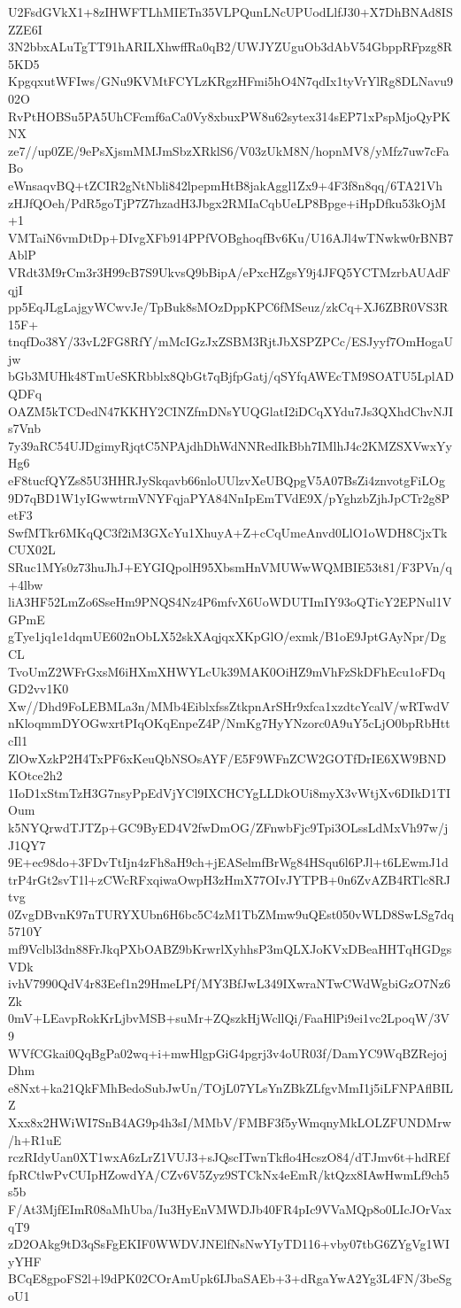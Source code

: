 U2FsdGVkX1+8zIHWFTLhMIETn35VLPQunLNcUPUodLlfJ30+X7DhBNAd8ISZZE6I
3N2bbxALuTgTT91hARILXhwffRa0qB2/UWJYZUguOb3dAbV54GbppRFpzg8R5KD5
KpgqxutWFIws/GNu9KVMtFCYLzKRgzHFmi5hO4N7qdIx1tyVrYlRg8DLNavu902O
RvPtHOBSu5PA5UhCFcmf6aCa0Vy8xbuxPW8u62sytex314sEP71xPspMjoQyPKNX
ze7//up0ZE/9ePsXjsmMMJmSbzXRklS6/V03zUkM8N/hopnMV8/yMfz7uw7cFaBo
eWnsaqvBQ+tZCIR2gNtNbli842lpepmHtB8jakAggl1Zx9+4F3f8n8qq/6TA21Vh
zHJfQOeh/PdR5goTjP7Z7hzadH3Jbgx2RMIaCqbUeLP8Bpge+iHpDfku53kOjM+1
VMTaiN6vmDtDp+DIvgXFb914PPfVOBghoqfBv6Ku/U16AJl4wTNwkw0rBNB7AblP
VRdt3M9rCm3r3H99cB7S9UkvsQ9bBipA/ePxcHZgsY9j4JFQ5YCTMzrbAUAdFqjI
pp5EqJLgLajgyWCwvJe/TpBuk8sMOzDppKPC6fMSeuz/zkCq+XJ6ZBR0VS3R15F+
tnqfDo38Y/33vL2FG8RfY/mMcIGzJxZSBM3RjtJbXSPZPCc/ESJyyf7OmHogaUjw
bGb3MUHk48TmUeSKRbblx8QbGt7qBjfpGatj/qSYfqAWEcTM9SOATU5LplADQDFq
OAZM5kTCDedN47KKHY2CINZfmDNsYUQGlatI2iDCqXYdu7Js3QXhdChvNJIs7Vnb
7y39aRC54UJDgimyRjqtC5NPAjdhDhWdNNRedIkBbh7IMlhJ4c2KMZSXVwxYyHg6
eF8tucfQYZs85U3HHRJySkqavb66nloUUlzvXeUBQpgV5A07BsZi4znvotgFiLOg
9D7qBD1W1yIGwwtrmVNYFqjaPYA84NnIpEmTVdE9X/pYghzbZjhJpCTr2g8PetF3
SwfMTkr6MKqQC3f2iM3GXcYu1XhuyA+Z+cCqUmeAnvd0LlO1oWDH8CjxTkCUX02L
SRuc1MYs0z73huJhJ+EYGIQpolH95XbsmHnVMUWwWQMBIE53t81/F3PVn/q+4lbw
liA3HF52LmZo6SseHm9PNQS4Nz4P6mfvX6UoWDUTImIY93oQTicY2EPNul1VGPmE
gTye1jq1e1dqmUE602nObLX52skXAqjqxXKpGlO/exmk/B1oE9JptGAyNpr/DgCL
TvoUmZ2WFrGxsM6iHXmXHWYLcUk39MAK0OiHZ9mVhFzSkDFhEcu1oFDqGD2vv1K0
Xw//Dhd9FoLEBMLa3n/MMb4EiblxfssZtkpnArSHr9xfca1xzdtcYcalV/wRTwdV
nKloqmmDYOGwxrtPIqOKqEnpeZ4P/NmKg7HyYNzorc0A9uY5cLjO0bpRbHttcIl1
ZlOwXzkP2H4TxPF6xKeuQbNSOsAYF/E5F9WFnZCW2GOTfDrIE6XW9BNDKOtce2h2
1IoD1xStmTzH3G7nsyPpEdVjYCl9IXCHCYgLLDkOUi8myX3vWtjXv6DIkD1TIOum
k5NYQrwdTJTZp+GC9ByED4V2fwDmOG/ZFnwbFjc9Tpi3OLssLdMxVh97w/jJ1QY7
9E+ec98do+3FDvTtIjn4zFh8aH9ch+jEASelmfBrWg84HSqu6l6PJl+t6LEwmJ1d
trP4rGt2svT1l+zCWcRFxqiwaOwpH3zHmX77OIvJYTPB+0n6ZvAZB4RTlc8RJtvg
0ZvgDBvnK97nTURYXUbn6H6bc5C4zM1TbZMmw9uQEst050vWLD8SwLSg7dq5710Y
mf9Vclbl3dn88FrJkqPXbOABZ9bKrwrlXyhhsP3mQLXJoKVxDBeaHHTqHGDgsVDk
ivhV7990QdV4r83Eef1n29HmeLPf/MY3BfJwL349IXwraNTwCWdWgbiGzO7Nz6Zk
0mV+LEavpRokKrLjbvMSB+suMr+ZQszkHjWcllQi/FaaHlPi9ei1vc2LpoqW/3V9
WVfCGkai0QqBgPa02wq+i+mwHlgpGiG4pgrj3v4oUR03f/DamYC9WqBZRejojDhm
e8Nxt+ka21QkFMhBedoSubJwUn/TOjL07YLsYnZBkZLfgvMmI1j5iLFNPAflBILZ
Xxx8x2HWiWI7SnB4AG9p4h3sI/MMbV/FMBF3f5yWmqnyMkLOLZFUNDMrw/h+R1uE
rczRIdyUan0XT1wxA6zLrZ1VUJ3+sJQscITwnTkflo4HcszO84/dTJmv6t+hdREf
fpRCtlwPvCUIpHZowdYA/CZv6V5Zyz9STCkNx4eEmR/ktQzx8IAwHwmLf9ch5s5b
F/At3MjfEImR08aMhUba/Iu3HyEnVMWDJb40FR4pIc9VVaMQp8o0LIcJOrVaxqT9
zD2OAkg9tD3qSsFgEKIF0WWDVJNElfNsNwYIyTD116+vby07tbG6ZYgVg1WIyYHF
BCqE8gpoFS2l+l9dPK02COrAmUpk6IJbaSAEb+3+dRgaYwA2Yg3L4FN/3beSgoU1
